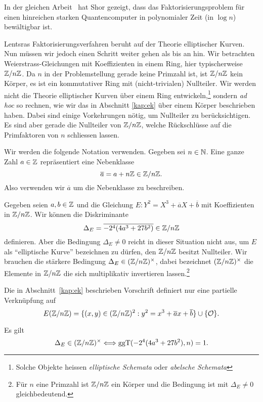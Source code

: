 In der gleichen Arbeit~\cite{shor} hat Shor gezeigt, dass das
Faktorisierungsproblem für einen hinreichen starken Quantencomputer
in polynomialer Zeit (in $\log n$) bewältigbar ist.

Lentsras Faktorisierungsverfahren beruht auf der Theorie
elliptischer Kurven. Nun müssen wir jedoch einen Schritt weiter gehen
als bis an hin. Wir betrachten Weierstrass-Gleichungen mit
Koeffizienten in einem Ring, hier typischerweise ${\mathbb{Z}}/n{\mathbb{Z}}$. Da
$n$ in der Problemstellung gerade keine Primzahl ist, ist ${\mathbb{Z}}/n{\mathbb{Z}}$
kein Körper, es ist ein kommutativer Ring mit (nicht-trivialen)
Nullteiler. Wir werden nicht die Theorie elliptischer Kurven über
einem Ring entwickeln,\footnote{Solche Objekte heissen
  \emph{elliptische Schemata} oder \emph{abelsche Schemata}}
sondern  \textit{ad hoc} so rechnen, wie wir das in Abschnitt
\ref{kap:ek} über einem Körper beschrieben haben. Dabei sind einige
Vorkehrungen nötig, um Nullteiler zu berücksichtigen. 
Es sind aber
gerade die Nullteiler von ${\mathbb{Z}}/n{\mathbb{Z}}$, welche Rückschlüsse auf die
Primfaktoren von $n$ schliessen lassen.

Wir werden die folgende Notation verwenden. Gegeben sei $n\in{\mathbb{N}}$. Eine ganze Zahl $a\in{\mathbb{Z}}$
 repräsentiert eine Nebenklasse
$$
\overline a = a+n{\mathbb{Z}}\in {\mathbb{Z}}/n{\mathbb{Z}}.
$$
Also verwenden wir $\overline a$ um die Nebenklasse zu beschreiben. 

Gegeben seien $a,b\in{\mathbb{Z}}$ und die Gleichung $E : Y^2= X^3+\overline a
X + \overline b$ mit Koeffizienten in ${\mathbb{Z}}/n{\mathbb{Z}}$. Wir können die
Diskriminante
$$\Delta_E = \overline{-2^4(4a^3+27b^2)}\in{\mathbb{Z}}/n{\mathbb{Z}}$$ definieren. Aber die Bedingung $\Delta_E\not=0$
reicht in dieser Situation nicht aus, um $E$ als ``elliptische Kurve''
bezeichnen zu dürfen, den ${\mathbb{Z}}/n{\mathbb{Z}}$ besitzt Nullteiler. Wir brauchen
die stärkere Bedingung $\Delta_E \in ({\mathbb{Z}}/n{\mathbb{Z}})^\times$, dabei
bezeichnet $({\mathbb{Z}}/n{\mathbb{Z}})^\times$ die Elemente in ${\mathbb{Z}}/n{\mathbb{Z}}$ die sich
multiplikativ invertieren lassen.\footnote{Für $n$ eine Primzahl ist ${\mathbb{Z}}/n{\mathbb{Z}}$
ein Körper und die Bedingung ist mit $\Delta_E\not=0$
gleichbedeutend.}

Die in
Abschnitt~\ref{kap:ek} beschrieben Vorschrift definiert nur eine
partielle Verknüpfung auf 
\begin{equation*}
E({\mathbb{Z}}/n{\mathbb{Z}}) =   \{(x,y) \in ({\mathbb{Z}}/n{\mathbb{Z}})^2:  y^2 = x^3+\overline a x +
\overline b\}\cup\{{\mathcal O}\}. 
\end{equation*}

Es gilt
\begin{equation}
  \label{eq:ggTDeltaE}
  \Delta_E \in ({\mathbb{Z}}/n{\mathbb{Z}})^\times\Longleftrightarrow
  \mathrm{ggT}(-2^4(4a^3+27b^2),n) = 1.
\end{equation}

